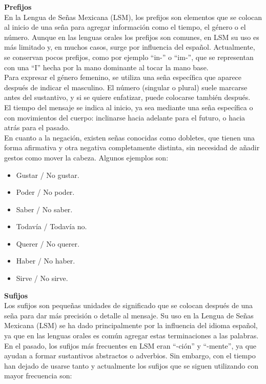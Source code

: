 \textbf{Prefijos}\\
En la Lengua de Señas Mexicana (LSM), los prefijos son elementos que se colocan al inicio de una seña para agregar información como el tiempo, el género o el número. Aunque en las lenguas orales los prefijos son comunes, en LSM su uso es más limitado y, en muchos casos, surge por influencia del español. Actualmente, se conservan pocos prefijos, como por ejemplo “in-” o “im-”, que se representan con una “I” hecha por la mano dominante al tocar la mano base.\\

Para expresar el género femenino, se utiliza una seña específica que aparece después de indicar el masculino. El número (singular o plural) suele marcarse antes del sustantivo, y si se quiere enfatizar, puede colocarse también después.\\

El tiempo del mensaje se indica al inicio, ya sea mediante una seña específica o con movimientos del cuerpo: inclinarse hacia adelante para el futuro, o hacia atrás para el pasado.\\

En cuanto a la negación, existen señas conocidas como dobletes, que tienen una forma afirmativa y otra negativa completamente distinta, sin necesidad de añadir gestos como mover la cabeza. Algunos ejemplos son:
\begin{itemize}
    \item Gustar / No gustar.
    \item Poder / No poder.
    \item Saber / No saber.
    \item Todavía / Todavía no.
    \item Querer / No querer.
    \item Haber / No haber.
    \item Sirve / No sirve.
\end{itemize}

\textbf{Sufijos}\\
Los sufijos son pequeñas unidades de significado que se colocan después de una seña para dar más precisión o detalle al mensaje. Su uso en la Lengua de Señas Mexicana (LSM) se ha dado principalmente por la influencia del idioma español, ya que en las lenguas orales es común agregar estas terminaciones a las palabras.\\

En el pasado, los sufijos más frecuentes en LSM eran “-ción” y “-mente”, ya que ayudan a formar sustantivos abstractos o adverbios. Sin embargo, con el tiempo han dejado de usarse tanto y actualmente los sufijos que se siguen utilizando con mayor frecuencia son:

